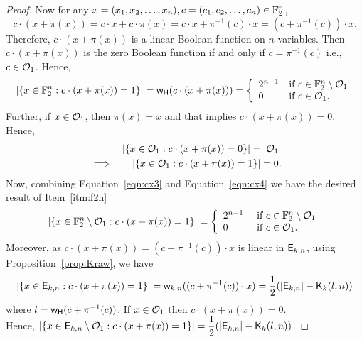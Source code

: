 \documentclass{llncs}
\begin{document}
\begin{proof}
Now for any $x = (x_1, x_2, \ldots, x_n), c = (c_1, c_2, \ldots, c_n) \in \mathbb{F}_2^n$,
\begin{equation}\label{eqn:cx2}
c \cdot (x+\pi(x)) = c \cdot x + c \cdot \pi(x) = c \cdot x + \pi^{-1}(c) \cdot x  =  (c+\pi^{-1}(c)) \cdot x .
\end{equation}
Therefore, $c \cdot (x+\pi(x))$ is a linear Boolean function on $n$ variables. 
Then $c \cdot (x+\pi(x))$ is the zero Boolean function if and only if $c  = \pi^{-1}(c)$ i.e., $c \in \mathcal{O}_1$.
Hence,
\begin{equation}\label{eqn:cx3}
|\{x \in \mathbb{F}_2^n : c \cdot (x + \pi(x))= 1\}| = \mathsf{w_H}(c \cdot (x+\pi(x))) 
= \left\{ \begin{array}{ll}
2^{n-1} & \text{if } c \in \mathbb{F}_2^n \setminus \mathcal{O}_1 \\
0 & \text{if } c \in \mathcal{O}_1.
\end{array} \right.
\end{equation}
Further, if $x \in \mathcal{O}_1$, then $\pi(x) = x$ and that implies $c \cdot (x+\pi(x)) = 0$. Hence,
\begin{eqnarray}\label{eqn:cx4}
&& |\{x \in \mathcal{O}_1 : c \cdot (x + \pi(x))= 0\}| = |\mathcal{O}_1|\nonumber \\
&\implies & |\{x \in \mathcal{O}_1 : c \cdot (x + \pi(x))= 1\}| = 0.
\end{eqnarray}
Now, combining Equation~\ref{eqn:cx3} and Equation~\ref{eqn:cx4} we have the desired result of Item~\ref{itm:f2n}
$$|\{x \in \mathbb{F}_2^n \setminus \mathcal{O}_1 : c \cdot (x + \pi(x))= 1\}| 
= \left \{ \begin{array}{ll}
2^{n-1}  &  \text{ if } c \in \mathbb{F}_2^n \setminus \mathcal{O}_1  \\
0              &  \text{ if } c \in \mathcal{O}_1.
\end{array} \right.$$
Moreover, as $c \cdot (x+\pi(x)) = (c+\pi^{-1}(c)) \cdot x$ is linear in $\mathsf{E}_{k,n}$, using Proposition~\ref{prop:Kraw}, we have
$$\left| \{x \in \mathsf{E}_{k,n} : c \cdot (x + \pi(x))= 1\} \right| = \mathsf{w}_{k,n}((c+\pi^{-1}(c)) \cdot x) = \frac{1}{2} (|\mathsf{E}_{k,n}| - \mathsf{K}_{k}(l,n))$$
where $l = \mathsf{w_H}(c+\pi^{-1}(c))$. 
If $x \in \mathcal{O}_1$ then $c \cdot (x+\pi(x)) = 0$.\\
Hence, $\displaystyle{\left| \{x \in \mathsf{E}_{k,n} \setminus \mathcal{O}_1 : c \cdot (x + \pi(x))= 1\} \right| = \frac{1}{2} (|\mathsf{E}_{k,n}| - \mathsf{K}_{k}(l,n))}$.
\end{proof} 
\end{document}
